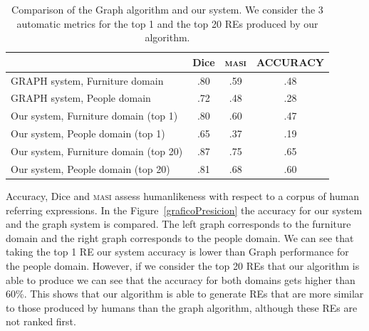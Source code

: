 \begin{table}[h!]
\begin{center}
\begin{tabular}{|l|c|c|c|}
\hline
	 	& 	Dice		&	\textsc{masi}	&	ACCURACY		\\
\hline
GRAPH system, Furniture domain	& 	.80 		&	.59	&	.48		 	\\
GRAPH system, People domain 	& 	.72		&	.48	&	.28			\\
\hline
Our system, Furniture domain (top 1)	&	.80		&	.60	&	.47		\\
Our system, People domain (top 1)	&	.65		&	.37	&	.19		\\
\hline
Our system, Furniture domain (top 20)&	.87		&	.75  	&	.65		\\
Our system, People domain (top 20)   &	.81		&	.68	&	.60		\\
\hline
\end{tabular}
\caption{Comparison of the Graph algorithm and our system. We consider the 3 automatic metrics for the top 1 and the top 20 REs produced by our algorithm.}
\vspace*{-.5cm}
\label{Tabla_sis_1_20}
\end{center}
\end{table}


Accuracy, Dice and \textsc{masi} assess humanlikeness with respect to a corpus of human referring expressions. In the Figure~\ref{graficoPresicion} the accuracy for our system and the graph system is compared. The left graph corresponds to the furniture domain and the right graph corresponds to the people domain. We can see that taking the top 1 RE our system accuracy is lower than Graph performance for the people domain. However, if we consider the top 20 REs that our algorithm is able to produce we can see that the accuracy for both domains gets higher than 60\%. This shows that our algorithm is able to generate REs that are more similar to those produced by humans than the graph algorithm, although these REs are not ranked first. 

